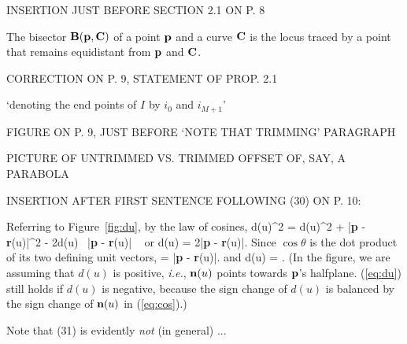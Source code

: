 
\clearpage

INSERTION JUST BEFORE SECTION 2.1 ON P. 8

\begin{dfn}
The bisector ${\bf B}({\bf p},{\bf C})$ of a point ${\bf p}$ and a curve 
${\bf C}$ is the locus
traced by a point that remains equidistant from ${\bf p}$ and ${\bf C}$.
\end{dfn}


\clearpage

CORRECTION ON P. 9, STATEMENT OF PROP. 2.1

`denoting the end points of $I$ by $i_{0}$ and $i_{M+1}$'

FIGURE ON P. 9, JUST BEFORE `NOTE THAT TRIMMING' PARAGRAPH

PICTURE OF UNTRIMMED VS. TRIMMED OFFSET OF, SAY, A PARABOLA


\clearpage

INSERTION AFTER FIRST SENTENCE FOLLOWING (30) ON P. 10:

Referring to Figure~\ref{fig:du},
by the law of cosines,
\be
	d(u)^{2} = d(u)^{2} + |{\bf p} - {\bf r}(u)|^{2} - 
		   2d(u) \ |{\bf p} - {\bf r}(u)| \ \cos \theta
\ee
or 
\be
	d(u) = 
		    {2|{\bf p} - {\bf r}(u)|\cos \theta}.
\ee
Since $\cos \theta$ is the dot product of its two defining unit vectors,
\be
\label{eq:cos}
	\cos \theta = 
			   {|{\bf p} - {\bf r}(u)|}.
\ee
and
\be
\label{eq:du}
	d(u) = .
\ee
(In the figure, we are assuming that $d(u)$ is positive, {\em i.e.}, 
${\bf n}(u)$ points towards
${\bf p}$'s halfplane.
(\ref{eq:du}) still holds if $d(u)$ is negative,
because the sign change of $d(u)$ is balanced by the sign
change of ${\bf n}(u)$ in (\ref{eq:cos}).)


Note that (31) is evidently {\em not} (in general) ...


